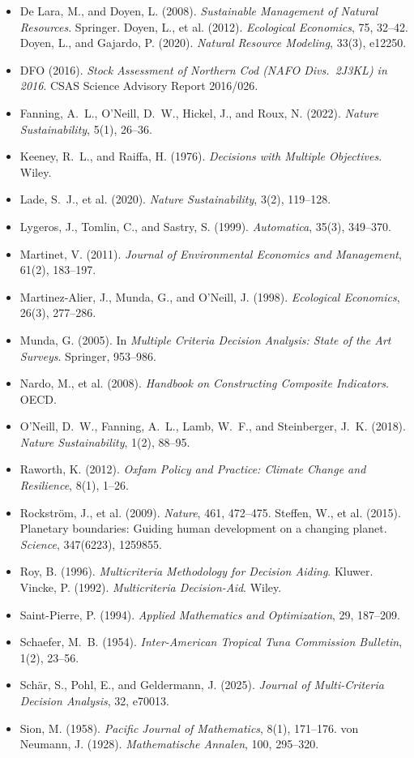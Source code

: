 \begin{itemize}[leftmargin=1.5em,itemsep=1pt]
\item De Lara, M., and Doyen, L. (2008). \emph{Sustainable Management of Natural Resources}. Springer. Doyen, L., et al. (2012). \emph{Ecological Economics}, 75, 32--42. Doyen, L., and Gajardo, P. (2020). \emph{Natural Resource Modeling}, 33(3), e12250.
\item DFO (2016). \emph{Stock Assessment of Northern Cod (NAFO Divs.\ 2J3KL) in 2016}. CSAS Science Advisory Report 2016/026.
\item Fanning, A.~L., O'Neill, D.~W., Hickel, J., and Roux, N. (2022). \emph{Nature Sustainability}, 5(1), 26--36.
\item Keeney, R.~L., and Raiffa, H. (1976). \emph{Decisions with Multiple Objectives}. Wiley.
\item Lade, S.~J., et al. (2020). \emph{Nature Sustainability}, 3(2), 119--128.
\item Lygeros, J., Tomlin, C., and Sastry, S. (1999). \emph{Automatica}, 35(3), 349--370.
\item Martinet, V. (2011). \emph{Journal of Environmental Economics and Management}, 61(2), 183--197.
\item Martinez-Alier, J., Munda, G., and O'Neill, J. (1998). \emph{Ecological Economics}, 26(3), 277--286.
\item Munda, G. (2005). In \emph{Multiple Criteria Decision Analysis: State of the Art Surveys}. Springer, 953--986.
\item Nardo, M., et al. (2008). \emph{Handbook on Constructing Composite Indicators}. OECD.
\item O'Neill, D.~W., Fanning, A.~L., Lamb, W.~F., and Steinberger, J.~K. (2018). \emph{Nature Sustainability}, 1(2), 88--95.
\item Raworth, K. (2012). \emph{Oxfam Policy and Practice: Climate Change and Resilience}, 8(1), 1--26.
\item Rockstr\"om, J., et al. (2009). \emph{Nature}, 461, 472--475. Steffen, W., et al. (2015). Planetary boundaries: Guiding human development on a changing planet. \emph{Science}, 347(6223), 1259855.
\item Roy, B. (1996). \emph{Multicriteria Methodology for Decision Aiding}. Kluwer. Vincke, P. (1992). \emph{Multicriteria Decision-Aid}. Wiley.
\item Saint-Pierre, P. (1994). \emph{Applied Mathematics and Optimization}, 29, 187--209.
\item Schaefer, M.~B. (1954). \emph{Inter-American Tropical Tuna Commission Bulletin}, 1(2), 23--56.
\item Sch\"ar, S., Pohl, E., and Geldermann, J. (2025). \emph{Journal of Multi-Criteria Decision Analysis}, 32, e70013.
\item Sion, M. (1958). \emph{Pacific Journal of Mathematics}, 8(1), 171--176. von Neumann, J. (1928). \emph{Mathematische Annalen}, 100, 295--320.
\end{itemize}


